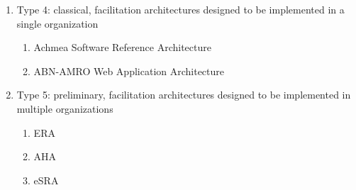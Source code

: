 \documentclass[review]{elsarticle}
\begin{document}
\begin{enumerate}
\begin{enumerate}
        \item Type 4: classical, facilitation architectures designed to be implemented in a single organization
        \begin{enumerate}
            \item Achmea Software Reference Architecture   \cite{greefhorst2006achmea}
            \item ABN-AMRO Web Application Architecture \cite{greefhorst1999een}
        \end{enumerate}

        \item Type 5: preliminary, facilitation architectures designed to be implemented in multiple organizations
        \begin{enumerate}
            \item ERA   \cite{angelov2008contracting}
            \item AHA   \cite{wu2002reference}
            \item eSRA  \cite{norta2007exploring}
        \end{enumerate}
    \end{enumerate}
  \end{enumerate}
\end{document}

